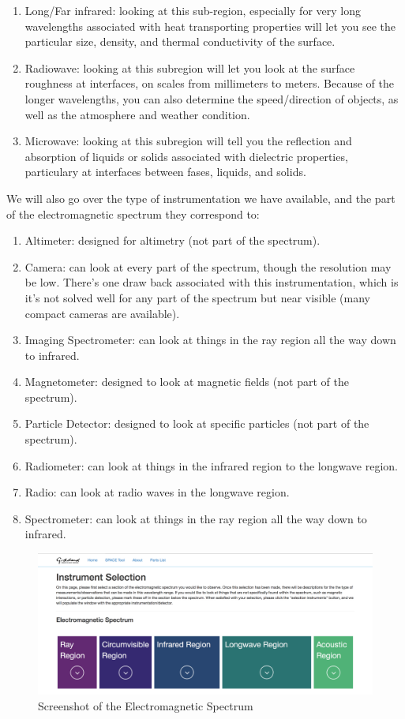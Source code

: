 \documentclass[a4, 12 pt]{article} %
\begin{document}
\begin{enumerate}
\item Long/Far infrared: looking at this sub-region, especially for very long wavelengths associated with heat transporting properties will let you see the particular size, density, and thermal conductivity of the surface. 
\item Radiowave: looking at this subregion will let you look at the surface roughness at interfaces, on scales from millimeters to meters. Because of the longer wavelengths, you can also determine the speed/direction of objects, as well as the atmosphere and weather condition. 
\item Microwave: looking at this subregion will tell you the reflection and absorption of liquids or solids associated with dielectric properties, particulary at interfaces between fases, liquids, and solids. 
\end{enumerate}
We will also go over the type of instrumentation we have available, and the part of the electromagnetic spectrum they correspond to:
\begin{enumerate}
\item Altimeter: designed for altimetry (not part of the spectrum). 
\item Camera: can look at every part of the spectrum, though the resolution may be low. There's one draw back associated with this instrumentation, which is it's not solved well for any part of the spectrum but near visible (many compact cameras are available). 
\item Imaging Spectrometer: can look at things in the ray region all the way down to infrared. 
\item Magnetometer: designed to look at magnetic fields (not part of the spectrum). 
\item Particle Detector: designed to look at specific particles (not part of the spectrum). 
\item Radiometer: can look at things in the infrared region to the longwave region. 
\item Radio: can look at radio waves in the longwave region. 
\item Spectrometer: can look at things in the ray region all the way down to infrared. 
\end{enumerate}
\begin{figure}[H]
\begin{center}
\includegraphics[width=\linewidth]{2a}
\caption{Screenshot of the Electromagnetic Spectrum}
\label{default}
\end{center}
\end{figure}
\end{document}
